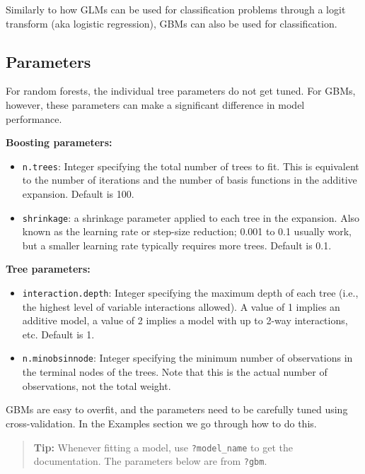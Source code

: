 \documentclass[openany]{book}
\begin{document}
Similarly to how GLMs can be used for classification problems through a logit transform (aka logistic regression), GBMs can also be used for classification.

\hypertarget{parameters}{%
\subsection{Parameters}\label{parameters}}

For random forests, the individual tree parameters do not get tuned. For GBMs, however, these parameters can make a significant difference in model performance.

\textbf{Boosting parameters:}

\begin{itemize}
\item
  \texttt{n.trees}: Integer specifying the total number of trees to fit. This is equivalent to the number of iterations and the number of basis functions in the additive expansion. Default is 100.
\item
  \texttt{shrinkage}: a shrinkage parameter applied to each tree in the expansion. Also known as the learning rate or step-size reduction; 0.001 to 0.1 usually work, but a smaller learning rate typically requires more trees. Default is 0.1.
\end{itemize}

\textbf{Tree parameters:}

\begin{itemize}
\item
  \texttt{interaction.depth}: Integer specifying the maximum depth of each tree (i.e., the highest level of variable interactions allowed). A value of 1 implies an additive model, a value of 2 implies a model with up to 2-way interactions, etc. Default is 1.
\item
  \texttt{n.minobsinnode}: Integer specifying the minimum number of observations in the terminal nodes of the trees. Note that this is the actual number of observations, not the total weight.
\end{itemize}

GBMs are easy to overfit, and the parameters need to be carefully tuned using cross-validation. In the Examples section we go through how to do this.

\begin{quote}
\textbf{Tip:} Whenever fitting a model, use \texttt{?model\_name} to get the documentation. The parameters below are from \texttt{?gbm}.
\end{quote}
\end{document}

